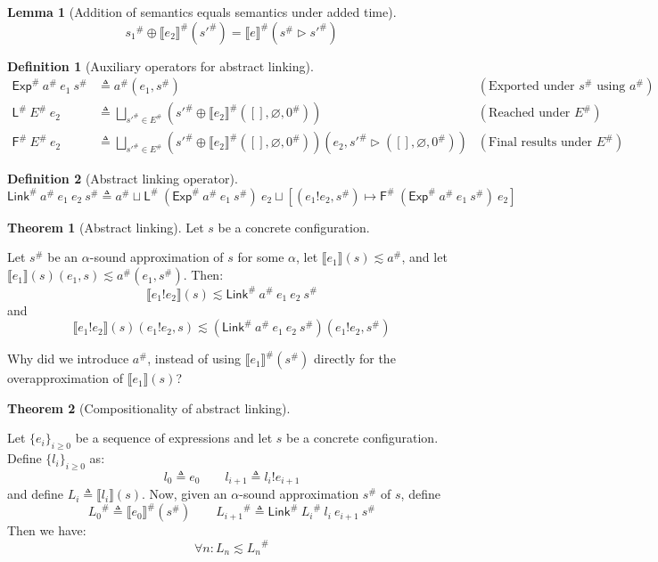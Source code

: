 \documentclass[acmsmall,screen,review]{acmart}
\theoremstyle{definition}
\newtheorem{definition}{Definition}[section]
\newtheorem{lem}{Lemma}[section]
\newtheorem{thm}{Theorem}[section]
\newcommand*{\A}[1]{{#1}^{\#}}
\newcommand*{\link}[2]{{#1}\mathtt{!}{#2}}
\newcommand*{\EE}{\mathsf{Exp}}
\newcommand*{\LL}{\mathsf{L}}
\newcommand*{\Link}{\mathsf{Link}}
\newcommand*{\sembracket}[1]{\lBrack{#1}\rBrack}
\begin{document}
\begin{lem}[Addition of semantics equals semantics under added time]
  \[
    \A{s_1}\oplus\A{\sembracket{e_2}}(\A{s'}) = \A{\sembracket{e}}(\A{s}\rhd\A{s'})
  \]
\end{lem}

\begin{definition}[Auxiliary operators for abstract linking]
  \begin{align*}
    \A\EE\:\A{a}\:e_1\:\A{s}   & \triangleq\A{a}(e_1,\A{s})                                                                                                          & (\text{Exported under }\A{s}\text{ using }\A{a}) \\
    \A\LL\:\A{E}\:e_2          & \triangleq\bigsqcup_{\A{s'}\in \A{E}}(\A{s'}\oplus\A{\sembracket{e_2}}([],\varnothing,\A{0}))                                       & (\text{Reached under }\A{E})                     \\
    \A{\mathsf{F}}\:\A{E}\:e_2 & \triangleq\bigsqcup_{\A{s'}\in \A{E}}(\A{s'}\oplus\A{\sembracket{e_2}}([],\varnothing,\A{0}))(e_2,\A{s'}\rhd([],\varnothing,\A{0})) & (\text{Final results under }\A{E})
  \end{align*}
\end{definition}

\begin{definition}[Abstract linking operator]
  \[
    \A\Link\:\A{a}\:e_1\:e_2\:\A{s}\triangleq\A{a}\sqcup\A\LL\:(\A\EE\:\A{a}\:e_1\:\A{s})\:e_2\sqcup[(\link{e_1}{e_2},\A{s})\mapsto\A{\mathsf{F}}\:(\A\EE\:\A{a}\:e_1\:\A{s})\:e_2]
  \]
\end{definition}

\begin{thm}[Abstract linking]
  Let $s$ be a concrete configuration.

  Let $\A{s}$ be an $\alpha$-sound approximation of $s$ for some $\alpha$, let $\sembracket{e_1}(s)\lesssim\A{a}$, and let $\sembracket{e_1}(s)(e_1,s)\lesssim\A{a}(e_1,\A{s})$. Then:
  \[
    \sembracket{\link{e_1}{e_2}}(s)\lesssim\A\Link\:\A{a}\:e_1\:e_2\:\A{s}
  \]
  and
  \[
    \sembracket{\link{e_1}{e_2}}(s)(\link{e_1}{e_2},s)\lesssim(\A\Link\:\A{a}\:e_1\:e_2\:\A{s})(\link{e_1}{e_2},\A{s})
  \]
\end{thm}

Why did we introduce $\A{a}$, instead of using $\A{\sembracket{e_1}}(\A{s})$ directly for the overapproximation of $\sembracket{e_1}(s)$?

\begin{thm}[Compositionality of abstract linking]
  $\:$

  Let $\{e_i\}_{i\ge 0}$ be a sequence of expressions and let $s$ be a concrete configuration. Define $\{l_i\}_{i\ge 0}$ as:
  \[
    l_0\triangleq e_0\qquad l_{i+1}\triangleq\link{l_i}{e_{i+1}}
  \]
  and define $L_i\triangleq\sembracket{l_i}(s)$. Now, given an $\alpha$-sound approximation $\A{s}$ of $s$, define
  \[
    \A{L_0}\triangleq\A{\sembracket{e_0}}(\A{s})\qquad\A{L_{i+1}}\triangleq\A\Link\:\A{L_i}\:l_i\:e_{i+1}\:\A{s}
  \]
  Then we have:
  \[
    \forall n:L_n\lesssim\A{L_n}
  \]
\end{thm}

\end{document}
